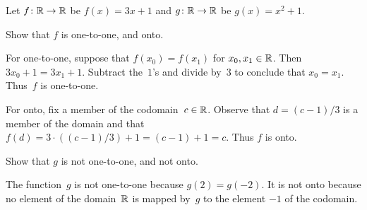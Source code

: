 \documentclass{ibl}  %
\begin{document}
\begin{problem} 
  Let $\mbox{$f\colon \mathbb{R}\to \mathbb{R}$}$ be $f(x)=3x+1$ and 
  $\mbox{$g\colon \mathbb{R}\to \mathbb{R}$}$ be $g(x)=x^2+1$.
\begin{exes}
\begin{exercise} 
  Show that $f$ is one-to-one, and onto.
\end{exercise}
\begin{answer}
  For one-to-one, suppose that $f(x_0)=f(x_1)$ for $x_0,x_1\in\mathbb{R}$.
  Then $3x_0+1=3x_1+1$.
  Subtract the~$1$'s and divide by~$3$ to conclude that $x_0=x_1$.
  Thus~$f$ is one-to-one.   

  For onto, fix a member of the codomain~$c\in\mathbb{R}$.
  Observe that $d=(c-1)/3$ is a member of the domain and that 
  $f(d)=3\cdot ((c-1)/3)+1=(c-1)+1=c$.
  Thus $f$ is onto.  
\end{answer}
\begin{exercise} 
  Show that $g$ is not one-to-one, and not onto.
\end{exercise}
\begin{answer}
  The function~$g$ is not one-to-one because $g(2)=g(-2)$.
  It is not onto because no element of the domain~$\mathbb{R}$ is mapped by~$g$
  to the element $-1$ of the codomain.          
\end{answer}
\end{exes}
\end{problem}
\end{document}
